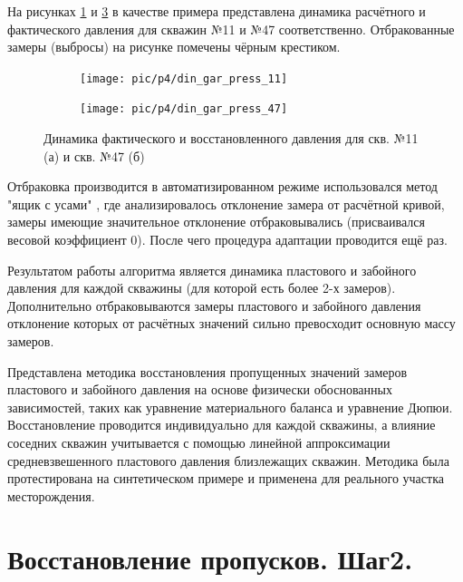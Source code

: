 \documentclass[14pt]{article}
\begin{document}
На рисунках \ref{fig:din_gar_press_11} и \ref{fig:din_gar_press_45} в качестве примера представлена динамика расчётного и фактического давления для скважин №11 и №47 соответственно. Отбракованные замеры (выбросы) на рисунке помечены чёрным крестиком. 
 \begin{figure}[!htb]
	\centering
	\begin{subfigure}[b]{0.9\linewidth}
	\texttt{[image: pic/p4/din\_gar\_press\_11]}
	\caption{}
	\label{fig:din_gar_press_11}
	\end{subfigure}
	\begin{subfigure}[b]{0.9\linewidth}
		\texttt{[image: pic/p4/din\_gar\_press\_47]}
		\caption{}
		\label{fig:din_gar_press_45}
	\end{subfigure}
		\caption{Динамика фактического и восстановленного давления для скв. №11 (а) и скв. №47 (б)}
\end{figure}
Отбраковка производится в автоматизированном режиме использовался метод "ящик с усами" \cite{BoxPlot}, где анализировалось отклонение замера от расчётной кривой, замеры имеющие значительное отклонение отбраковывались (присваивался весовой коэффициент 0). После чего процедура адаптации проводится ещё раз. 

Результатом работы алгоритма является динамика пластового и забойного давления для каждой скважины (для которой есть более 2-х замеров). Дополнительно отбраковываются замеры пластового и забойного давления отклонение которых от расчётных значений сильно превосходит основную массу замеров.

Представлена методика восстановления пропущенных значений замеров пластового и забойного давления на основе физически обоснованных зависимостей, таких как уравнение материального баланса и уравнение Дюпюи. Восстановление проводится индивидуально для каждой скважины, а влияние соседних скважин учитывается с помощью линейной аппроксимации средневзвешенного пластового давления близлежащих скважин. Методика была протестирована на синтетическом примере и применена для реального участка месторождения.

\section{Восстановление пропусков. Шаг2.}
\end{document}

